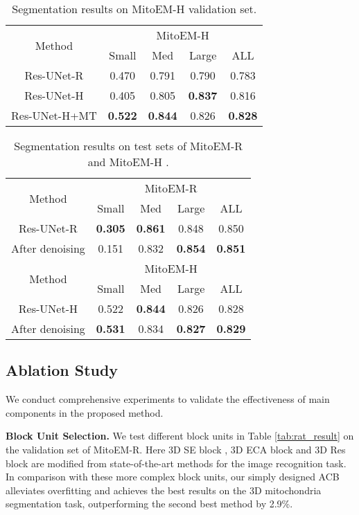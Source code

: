 \documentclass{article}
\begin{document}
\begin{table}[t]
\centering
\begin{tabular}{ccccc}
\hline
\multirow{2}{*}{Method} & \multicolumn{4}{c}{MitoEM-H} \\ \cline{2-5} 
                 & Small  & Med  & Large  & ALL \\ \hline
Res-UNet-R          & 0.470  & 0.791 & 0.790 & 0.783 \\
Res-UNet-H          & 0.405  & 0.805 & \textbf{0.837} & 0.816 \\
\hline
Res-UNet-H+MT & \textbf{0.522} & \textbf{0.844}  & 0.826  & \textbf{0.828}  \\ 
\hline
\end{tabular}
\caption{Segmentation results on MitoEM-H validation set.}
\label{tab:human_result}
\end{table}



\begin{table}[!t]
\centering
\begin{tabular}{ccccc}
\hline
\multirow{2}{*}{Method} & \multicolumn{4}{c}{MitoEM-R} \\ \cline{2-5} 
                 & Small  & Med  & Large  & ALL \\ \hline
Res-UNet-R          & \textbf{0.305}   & \textbf{0.861}  & 0.848  & 0.850  \\
After denoising           & 0.151  & 0.832  & \textbf{0.854}  & \textbf{0.851}  \\
\hline
\hline
\multirow{2}{*}{Method} & \multicolumn{4}{c}{MitoEM-H} \\ \cline{2-5} 
                 & Small  & Med  & Large  & ALL \\ \hline
Res-UNet-H          & 0.522 & \textbf{0.844}  & 0.826  & 0.828  \\
After denoising          & \textbf{0.531}  & 0.834  &\textbf{ 0.827}  &  \textbf{0.829} \\
\hline
\end{tabular}
\caption{Segmentation results on test sets of MitoEM-R and MitoEM-H .}
\label{tab:denoising test}
\end{table}


\subsection{Ablation Study}
We conduct comprehensive experiments to validate the effectiveness of main components in the proposed method.

\textbf{Block Unit Selection.} We test different block units in Table \ref{tab:rat_result} on the validation set of MitoEM-R. Here 3D SE block \cite{hu2018squeeze}, 3D ECA block \cite{wang2020eca} and 3D Res block \cite{he2016deep} are modified from state-of-the-art methods for the image recognition task. In comparison with these more complex block units, our simply designed ACB alleviates overfitting and achieves the best results on the 3D mitochondria segmentation task, outperforming the second best method by 2.9\%.
\end{document}
